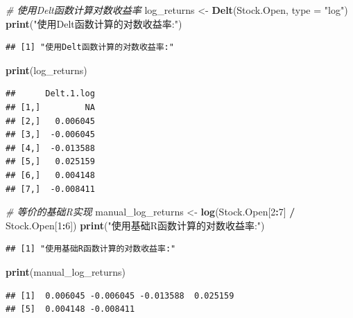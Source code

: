 \documentclass[]{ctexbook}
\newenvironment{Shaded}{\begin{snugshade}}{\end{snugshade}}
\newcommand{\AttributeTok}[1]{\textcolor[rgb]{0.13,0.29,0.53}{#1}}
\newcommand{\CommentTok}[1]{\textcolor[rgb]{0.56,0.35,0.01}{\textit{#1}}}
\newcommand{\DecValTok}[1]{\textcolor[rgb]{0.00,0.00,0.81}{#1}}
\newcommand{\FunctionTok}[1]{\textcolor[rgb]{0.13,0.29,0.53}{\textbf{#1}}}
\newcommand{\NormalTok}[1]{#1}
\newcommand{\OtherTok}[1]{\textcolor[rgb]{0.56,0.35,0.01}{#1}}
\newcommand{\SpecialCharTok}[1]{\textcolor[rgb]{0.81,0.36,0.00}{\textbf{#1}}}
\newcommand{\StringTok}[1]{\textcolor[rgb]{0.31,0.60,0.02}{#1}}
\begin{document}
\begin{Shaded}
\begin{Highlighting}[]
\CommentTok{\# 使用Delt函数计算对数收益率}
\NormalTok{log\_returns }\OtherTok{\textless{}{-}} \FunctionTok{Delt}\NormalTok{(Stock.Open, }\AttributeTok{type =} \StringTok{"log"}\NormalTok{)}
\FunctionTok{print}\NormalTok{(}\StringTok{"使用Delt函数计算的对数收益率:"}\NormalTok{)}
\end{Highlighting}
\end{Shaded}

\begin{verbatim}
## [1] "使用Delt函数计算的对数收益率:"
\end{verbatim}

\begin{Shaded}
\begin{Highlighting}[]
\FunctionTok{print}\NormalTok{(log\_returns)}
\end{Highlighting}
\end{Shaded}

\begin{verbatim}
##      Delt.1.log
## [1,]         NA
## [2,]   0.006045
## [3,]  -0.006045
## [4,]  -0.013588
## [5,]   0.025159
## [6,]   0.004148
## [7,]  -0.008411
\end{verbatim}

\begin{Shaded}
\begin{Highlighting}[]
\CommentTok{\# 等价的基础R实现}
\NormalTok{manual\_log\_returns }\OtherTok{\textless{}{-}} \FunctionTok{log}\NormalTok{(Stock.Open[}\DecValTok{2}\SpecialCharTok{:}\DecValTok{7}\NormalTok{] }\SpecialCharTok{/}\NormalTok{ Stock.Open[}\DecValTok{1}\SpecialCharTok{:}\DecValTok{6}\NormalTok{])}
\FunctionTok{print}\NormalTok{(}\StringTok{"使用基础R函数计算的对数收益率:"}\NormalTok{)}
\end{Highlighting}
\end{Shaded}

\begin{verbatim}
## [1] "使用基础R函数计算的对数收益率:"
\end{verbatim}

\begin{Shaded}
\begin{Highlighting}[]
\FunctionTok{print}\NormalTok{(manual\_log\_returns)}
\end{Highlighting}
\end{Shaded}

\begin{verbatim}
## [1]  0.006045 -0.006045 -0.013588  0.025159
## [5]  0.004148 -0.008411
\end{verbatim}
\end{document}
